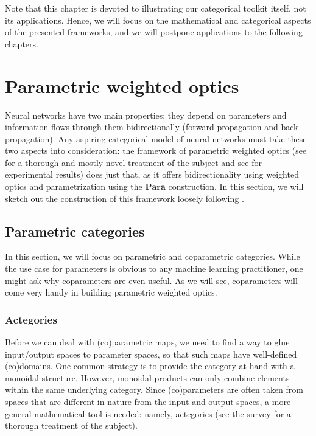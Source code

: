 \documentclass[12pt,a4paper,openright,twoside]{report}
\theoremstyle{plain}
\theoremstyle{definition}
\begin{document}
Note that this chapter is devoted to illustrating our categorical toolkit itself, not its applications. Hence, we will focus on the mathematical and categorical aspects of the presented frameworks, and we will postpone applications to the following chapters.

\section{Parametric weighted optics}

Neural networks have two main properties: they depend on parameters and information flows through them bidirectionally (forward propagation and back propagation). Any aspiring categorical model of neural networks must take these two aspects into consideration: the framework of parametric weighted optics (see \cite{gavranovic2024fundamental} for a thorough and mostly novel treatment of the subject and see \cite{cruttwell2022categorical} for experimental results) does just that, as it offers bidirectionality using weighted optics and parametrization using the $\mathbf{Para}$ construction.
In this section, we will sketch out the construction of this framework loosely following \cite{gavranovic2024fundamental}.

\subsection{Parametric categories}

In this section, we will focus on parametric and coparametric categories. While the use case for parameters is obvious to any machine learning practitioner, one might ask why coparameters are even useful. As we will see, coparameters will come very handy in building parametric weighted optics.


\subsubsection{Actegories}

Before we can deal with (co)parametric maps, we need to find a way to glue input/output spaces to parameter spaces, so that such maps have well-defined (co)domains. One common strategy is to provide the category at hand with a monoidal structure. However, monoidal products can only combine elements within the same underlying category. Since (co)parameters are often taken from spaces that are different in nature from the input and output spaces, a more general mathematical tool is needed: namely, actegories (see the survey \cite{capucci2022actegories} for a thorough treatment of the subject). 
\end{document}

